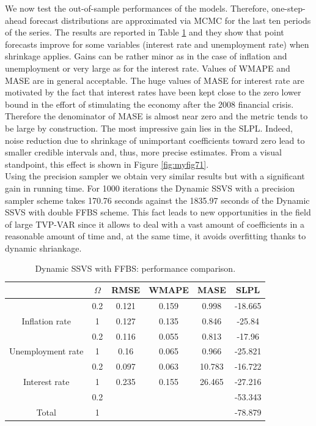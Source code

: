 \documentclass[
  12pt,
]{book}
\theoremstyle{break}
\theoremstyle{nonumberplain}
\begin{document}
We now test the out-of-sample performances of the models. Therefore,
one-step-ahead forecast distributions are approximated via MCMC for the
last ten periods of the series. The results are reported in Table
\ref{tab:mytab51} and they show that point forecasts improve for some
variables (interest rate and unemployment rate) when shrinkage applies.
Gains can be rather minor as in the case of inflation and unemployment
or very large as for the interest rate. Values of WMAPE and MASE are in
general acceptable. The huge values of MASE for interest rate are
motivated by the fact that interest rates have been kept close to the
zero lower bound in the effort of stimulating the economy after the 2008
financial crisis. Therefore the denominator of MASE is almost near zero
and the metric tends to be large by construction. The most impressive
gain lies in the SLPL. Indeed, noise reduction due to shrinkage of
unimportant coefficients toward zero lead to smaller credible intervals
and, thus, more precise estimates. From a visual standpoint, this effect
is shown in Figure \ref{fig:myfig71}.\\
Using the precision sampler we obtain very similar results but with a
significant gain in running time. For 1000 iterations the Dynamic SSVS
with a precision sampler scheme takes 170.76 seconds against the 1835.97
seconds of the Dynamic SSVS with double FFBS scheme. This fact leads to
new opportunities in the field of large TVP-VAR since it allows to deal
with a vast amount of coefficients in a reasonable amount of time and,
at the same time, it avoids overfitting thanks to dynamic shriankage.

\begin{table}[H]

\caption{\label{tab:mytab51}Dynamic SSVS with FFBS: performance comparison.}
\centering
\begin{tabular}[t]{>{}cccccc}
\toprule
  & $\Omega$ & RMSE & WMAPE & MASE & SLPL\\
\midrule
 & 0.2 & 0.121 & 0.159 & 0.998 & -18.665\\
\cmidrule{2-6}
\multirow[t]{-2}{*}{\centering\arraybackslash Inflation rate} & 1 & 0.127 & 0.135 & 0.846 & -25.84\\
\cmidrule{1-6}
 & 0.2 & 0.116 & 0.055 & 0.813 & -17.96\\
\cmidrule{2-6}
\multirow[t]{-2}{*}{\centering\arraybackslash Unemployment rate} & 1 & 0.16 & 0.065 & 0.966 & -25.821\\
\cmidrule{1-6}
 & 0.2 & 0.097 & 0.063 & 10.783 & -16.722\\
\cmidrule{2-6}
\multirow[t]{-2}{*}{\centering\arraybackslash Interest rate} & 1 & 0.235 & 0.155 & 26.465 & -27.216\\
\cmidrule{1-6}
 & 0.2 &  &  &  & -53.343\\
\cmidrule{2-6}
\multirow[t]{-2}{*}{\centering\arraybackslash Total} & 1 &  &  &  & -78.879\\
\bottomrule
\end{tabular}
\end{table}
\end{document}
